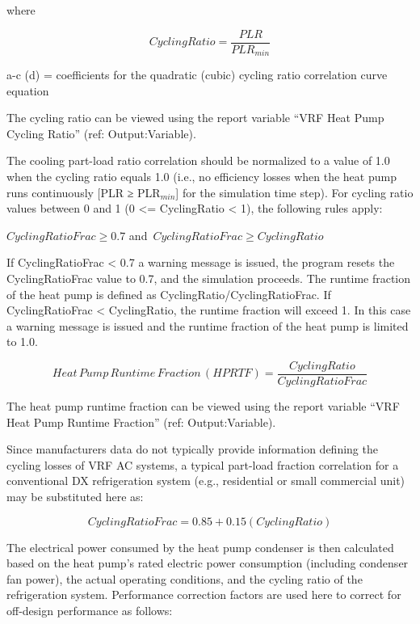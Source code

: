 where

\begin{equation}
  CyclingRatio = \frac{PLR}{PLR_{min}}
\end{equation}

a-c (d) = coefficients for the quadratic (cubic) cycling ratio correlation curve equation

The cycling ratio can be viewed using the report variable ``VRF Heat Pump Cycling Ratio'' (ref: Output:Variable).

The cooling part-load ratio correlation should be normalized to a value of 1.0 when the cycling ratio equals 1.0 (i.e., no efficiency losses when the heat pump runs continuously [PLR ≥ PLR\(_{min}\)] for the simulation time step). For cycling ratio values between 0 and 1 (0 <= CyclingRatio < 1), the following rules apply:

\(CyclingRatioFrac \ge 0.7\) and \(CyclingRatioFrac \ge CyclingRatio\)

If CyclingRatioFrac < 0.7 a warning message is issued, the program resets the CyclingRatioFrac value to 0.7, and the simulation proceeds. The runtime fraction of the heat pump is defined as CyclingRatio/CyclingRatioFrac. If CyclingRatioFrac < CyclingRatio, the runtime fraction will exceed 1. In this case a warning message is issued and the runtime fraction of the heat pump is limited to 1.0.

\begin{equation}
  Heat\,Pump\,Runtime\,Fraction\,(HPRTF) = \frac{CyclingRatio}{CyclingRatioFrac}
\end{equation}

The heat pump runtime fraction can be viewed using the report variable ``VRF Heat Pump Runtime Fraction'' (ref: Output:Variable).

Since manufacturers data do not typically provide information defining the cycling losses of VRF AC systems, a typical part-load fraction correlation for a conventional DX refrigeration system (e.g., residential or small commercial unit) may be substituted here as:

\begin{equation}
  CyclingRatioFrac = 0.85 + 0.15(CyclingRatio)
\end{equation}

The electrical power consumed by the heat pump condenser is then calculated based on the heat pump's rated electric power consumption (including condenser fan power), the actual operating conditions, and the cycling ratio of the refrigeration system. Performance correction factors are used here to correct for off-design performance as follows:


